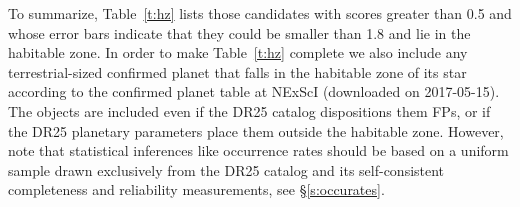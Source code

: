 To summarize, Table~\ref{t:hz} lists those candidates with scores greater than 0.5 and whose error bars indicate that they could be smaller than 1.8 \re{} and lie in the habitable zone.  In order to make Table~\ref{t:hz} complete we also include any terrestrial-sized confirmed planet that falls in the habitable zone of its star according to the confirmed planet table at NExScI (downloaded on 2017-05-15). The objects are included even if the DR25 catalog dispositions them FPs, or if the DR25 planetary parameters place them outside the habitable zone. However, note that statistical inferences like occurrence rates should be based on a uniform sample drawn exclusively from the DR25 catalog and its self-consistent completeness and reliability measurements, see \S\ref{s:occurates}.  



